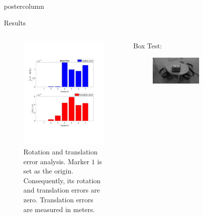 \documentclass{beamer}
\begin{document}
\begin{frame}
\begin{columns}
\begin{column}{.57\textwidth}
\begin{beamercolorbox}[center]{postercolumn}
\begin{minipage}{.98\textwidth}
{\begin{myblock}{Results}
\begin{minipage}[0.3\textheight]{\textwidth}
\begin{columns}[T]
\begin{column}{0.33\textwidth}
\begin{figure}
\includegraphics[width=1.0\textwidth]{img/synthetic_rt_new}
\caption{Rotation and translation error analysis. Marker $1$ is set as the origin. Consequently, its rotation and translation errors are zero. Translation errors are measured in meters.}
\label{fig:synthetic_rt}
\end{figure}
\end{column}
%
\begin{column}{0.33\textwidth}
Box Test: 
\begin{figure}
\centering
\includegraphics[width=0.6\textwidth]{img/box_snap}

\end{figure}
\end{column}
\end{columns}
\end{minipage}
\end{myblock}}
\end{minipage}
\end{beamercolorbox}
\end{column}
\end{columns}
\end{frame}
\end{document}
